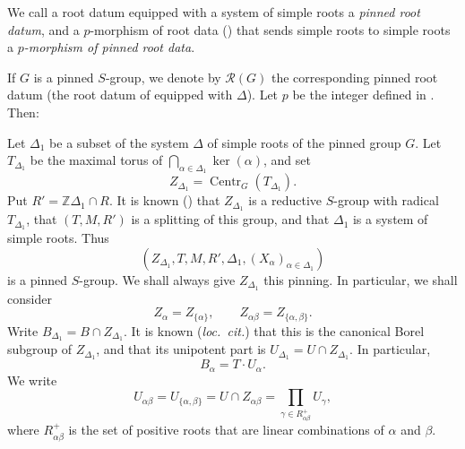 We call a root datum equipped with a system of simple roots a
\emph{pinned root datum}, and a \(p\)-morphism of root data
() that sends simple roots to simple roots a
\emph{\(p\)-morphism of pinned root data}.

If \(G\) is a pinned \(S\)-group, we denote by \(\mathscr R(G)\) the
corresponding pinned root datum (the root datum of 
equipped with \(\Delta\)). Let \(p\) be the integer defined in
. Then:




Let \(\Delta_1\) be a subset of the system \(\Delta\) of simple roots
of the pinned group \(G\). Let \(T_{\Delta_1}\) be the maximal torus
of \(\bigcap_{\alpha\in\Delta_1}\ker(\alpha)\), and set
\[
  Z_{\Delta_1}=\operatorname{Centr}_G(T_{\Delta_1}).
\]
Put \(R'=\mathbb Z\Delta_1\cap R\). It is known
() that \(Z_{\Delta_1}\) is a reductive \(S\)-group
with radical \(T_{\Delta_1}\), that \((T,M,R')\) is a splitting of
this group, and that \(\Delta_1\) is a system of simple roots. Thus
\[
  (Z_{\Delta_1},T,M,R',\Delta_1,(X_\alpha)_{\alpha\in\Delta_1})
\]
is a pinned \(S\)-group. We shall always give \(Z_{\Delta_1}\) this
pinning. In particular, we shall consider
\[
  Z_\alpha=Z_{\{\alpha\}},\qquad
  Z_{\alpha\beta}=Z_{\{\alpha,\beta\}}.
\]
Write \(B_{\Delta_1}=B\cap Z_{\Delta_1}\). It is known
(\textit{loc.\ cit.}) that this is the canonical Borel subgroup
of \(Z_{\Delta_1}\), and that its unipotent part is
\(U_{\Delta_1}=U\cap Z_{\Delta_1}\). In particular,
\[
  B_\alpha=T\cdot U_\alpha.
\]
We write
\[
  U_{\alpha\beta}=U_{\{\alpha,\beta\}}
  =U\cap Z_{\alpha\beta}
  =\prod_{\gamma\in R_{\alpha\beta}^{+}}U_\gamma,
\]
where \(R_{\alpha\beta}^{+}\) is the set of positive roots that are
linear combinations of \(\alpha\) and \(\beta\).

